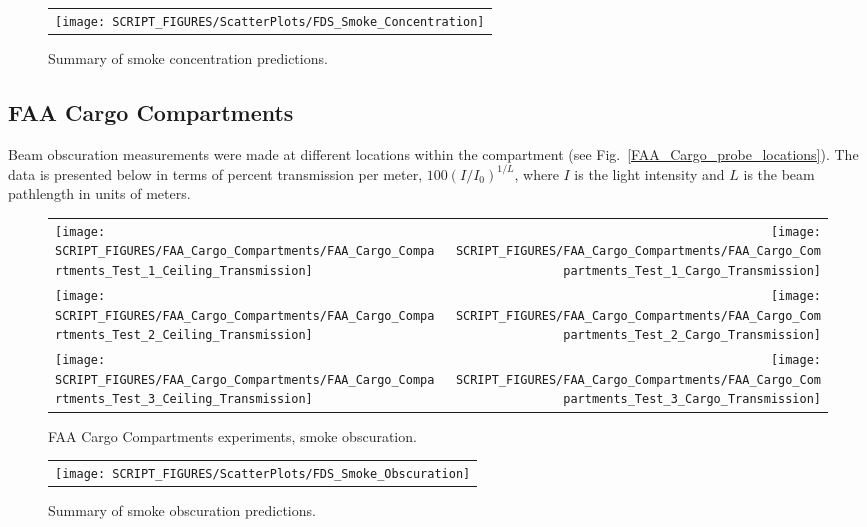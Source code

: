 \begin{figure}[p]
\begin{center}
\begin{tabular}{c}
\texttt{[image: SCRIPT\_FIGURES/ScatterPlots/FDS\_Smoke\_Concentration]}
\end{tabular}
\end{center}
\caption[Summary of smoke concentration predictions]{Summary of smoke concentration predictions.}
\end{figure}

\clearpage

\subsection{FAA Cargo Compartments}
\label{Smoke Obscuration}

Beam obscuration measurements were made at different locations within the compartment (see Fig.~\ref{FAA_Cargo_probe_locations}). The data is presented below in terms of percent transmission per meter, $100(I/I_0)^{1/L}$, where $I$ is the light intensity and $L$ is the beam pathlength in units of meters.

\begin{figure}[h]
\begin{tabular*}{\textwidth}{l@{\extracolsep{\fill}}r}
\texttt{[image: SCRIPT\_FIGURES/FAA\_Cargo\_Compartments/FAA\_Cargo\_Compartments\_Test\_1\_Ceiling\_Transmission]} &
\texttt{[image: SCRIPT\_FIGURES/FAA\_Cargo\_Compartments/FAA\_Cargo\_Compartments\_Test\_1\_Cargo\_Transmission]} \\
\texttt{[image: SCRIPT\_FIGURES/FAA\_Cargo\_Compartments/FAA\_Cargo\_Compartments\_Test\_2\_Ceiling\_Transmission]} &
\texttt{[image: SCRIPT\_FIGURES/FAA\_Cargo\_Compartments/FAA\_Cargo\_Compartments\_Test\_2\_Cargo\_Transmission]} \\
\texttt{[image: SCRIPT\_FIGURES/FAA\_Cargo\_Compartments/FAA\_Cargo\_Compartments\_Test\_3\_Ceiling\_Transmission]} &
\texttt{[image: SCRIPT\_FIGURES/FAA\_Cargo\_Compartments/FAA\_Cargo\_Compartments\_Test\_3\_Cargo\_Transmission]}
\end{tabular*}
\caption{FAA Cargo Compartments experiments, smoke obscuration.}
\end{figure}

\newpage

\begin{figure}[p]
\begin{center}
\begin{tabular}{c}
\texttt{[image: SCRIPT\_FIGURES/ScatterPlots/FDS\_Smoke\_Obscuration]}
\end{tabular}
\end{center}
\caption[Summary of smoke obscuration predictions]{Summary of smoke obscuration predictions.}
\end{figure}


